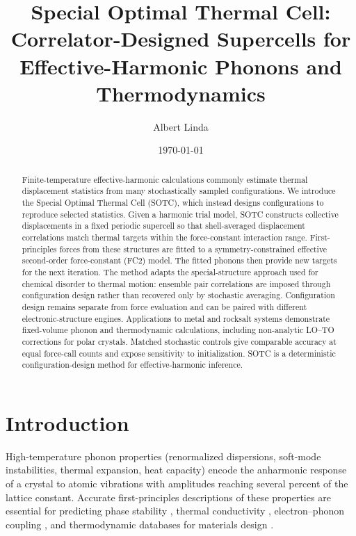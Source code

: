 \documentclass[aps,prb,reprint,amsmath,amssymb,floatfix]{revtex4-2}
\begin{document}
\title{Special Optimal Thermal Cell: Correlator-Designed Supercells for Effective-Harmonic Phonons and Thermodynamics}

\author{Albert Linda}

\date{\today}

\begin{abstract}
Finite-temperature effective-harmonic calculations commonly estimate thermal
displacement statistics from many stochastically sampled configurations. We
introduce the Special Optimal Thermal Cell (SOTC), which instead designs
configurations to reproduce selected statistics. Given a harmonic trial model,
SOTC constructs collective displacements in a fixed periodic supercell so that
shell-averaged displacement correlations match thermal targets within the
force-constant interaction range. First-principles forces from these structures
are fitted to a symmetry-constrained effective second-order force-constant
(FC2) model. The fitted phonons then provide new targets for the next iteration.
The method adapts the special-structure approach used for chemical disorder to
thermal motion: ensemble pair correlations are imposed through configuration
design rather than recovered only by stochastic averaging. Configuration design
remains separate from force evaluation and can be paired with different
electronic-structure engines. Applications to metal and rocksalt systems
demonstrate fixed-volume phonon and thermodynamic calculations, including
non-analytic LO--TO corrections for polar crystals. Matched stochastic controls
give comparable accuracy at equal force-call counts and expose sensitivity to
initialization. SOTC is a deterministic configuration-design method for
effective-harmonic inference.
\end{abstract}

\maketitle

\section{Introduction}\label{introduction}

High-temperature phonon properties (renormalized dispersions, soft-mode
instabilities, thermal expansion, heat capacity) encode the anharmonic
response of a crystal to atomic vibrations with amplitudes reaching
several percent of the lattice constant. Accurate first-principles
descriptions of these properties are essential for predicting phase
stability \cite{ref1}, thermal conductivity \cite{ref2},
electron--phonon coupling \cite{ref3}, and thermodynamic databases for
materials design \cite{ref4}.
\end{document}
